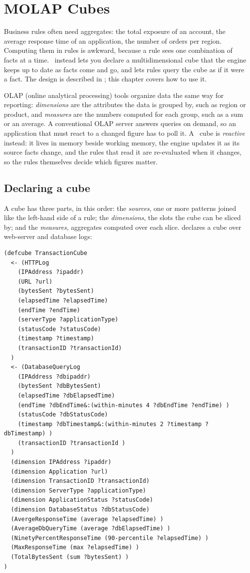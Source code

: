 \chapter{MOLAP Cubes}
\label{ch:molap}

Business rules often need aggregates: the total exposure of an account,
the average response time of an application, the number of orders per
region. Computing them in rules is awkward, because a rule sees one
combination of facts at a time. \Morendo\ instead lets you declare a
multidimensional cube that the engine keeps up to date as facts come and
go, and lets rules query the cube as if it were a fact. The design is
described in ; this chapter
covers how to use it.

OLAP (online analytical processing) tools organize data the same way for
reporting: \emph{dimensions} are the attributes the data is grouped by,
such as region or product, and \emph{measures} are the numbers computed
for each group, such as a sum or an average. A conventional OLAP server
answers queries on demand, so an application that must react to a
changed figure has to poll it. A \Morendo\ cube is \emph{reactive}
instead: it lives in memory beside working memory, the engine updates it
as its source facts change, and the rules that read it are re-evaluated
when it changes, so the rules themselves decide which figures matter.

\section{Declaring a cube}

A cube has three parts, in this order: the \emph{sources}, one or more
patterns joined like the left-hand side of a rule; the \emph{dimensions},
the slots the cube can be sliced by; and the \emph{measures}, aggregates
computed over each slice.  declares a cube
over web-server and database logs:

\begin{lstlisting}
(defcube TransactionCube
  <- (HTTPLog
    (IPAddress ?ipaddr)
    (URL ?url)
    (bytesSent ?bytesSent)
    (elapsedTime ?elapsedTime)
    (endTime ?endTime)
    (serverType ?applicationType)
    (statusCode ?statusCode)
    (timestamp ?timestamp)
    (transactionID ?transactionId)
  )
  <- (DatabaseQueryLog
    (IPAddress ?dbipaddr)
    (bytesSent ?dbBytesSent)
    (elapsedTime ?dbElapsedTime)
    (endTime ?dbEndTime&:(within-minutes 4 ?dbEndTime ?endTime) )
    (statusCode ?dbStatusCode)
    (timestamp ?dbTimestamp&:(within-minutes 2 ?timestamp ?dbTimestamp) )
    (transactionID ?transactionId )
  )
  (dimension IPAddress ?ipaddr)
  (dimension Application ?url)
  (dimension TransactionID ?transactionId)
  (dimension ServerType ?applicationType)
  (dimension ApplicationStatus ?statusCode)
  (dimension DatabaseStatus ?dbStatusCode)
  (AvergeResponseTime (average ?elapsedTime) )
  (AverageDbQueryTime (average ?dbElapsedTime) )
  (NinetyPercentResponseTime (90-percentile ?elapsedTime) )
  (MaxResponseTime (max ?elapsedTime) )
  (TotalBytesSent (sum ?bytesSent) )
)
\end{lstlisting}

